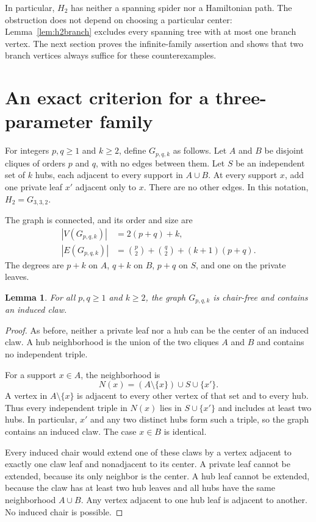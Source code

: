 \documentclass[11pt]{article}
\newtheorem{lemma}[theorem]{Lemma}
\theoremstyle{remark}
\begin{document}
In particular, $H_2$ has neither a spanning spider nor a Hamiltonian path. The obstruction does not depend on choosing a particular center: Lemma~\ref{lem:h2branch} excludes every spanning tree with at most one branch vertex. The next section proves the infinite-family assertion and shows that two branch vertices always suffice for these counterexamples.

\section{An exact criterion for a three-parameter family}

For integers $p,q\geq1$ and $k\geq2$, define $G_{p,q,k}$ as follows. Let $A$ and $B$ be disjoint cliques of orders $p$ and $q$, with no edges between them. Let $S$ be an independent set of $k$ hubs, each adjacent to every support in $A\cup B$. At every support $x$, add one private leaf $x'$ adjacent only to $x$. There are no other edges. In this notation, $H_2=G_{3,3,2}$.

The graph is connected, and its order and size are
\begin{align}
 |V(G_{p,q,k})|&=2(p+q)+k,\label{eq:order}\\
 |E(G_{p,q,k})|&=\binom p2+\binom q2+(k+1)(p+q).\label{eq:size}
\end{align}
The degrees are $p+k$ on $A$, $q+k$ on $B$, $p+q$ on $S$, and one on the private leaves.

\begin{lemma}\label{lem:generalchair}
For all $p,q\geq1$ and $k\geq2$, the graph $G_{p,q,k}$ is chair-free and contains an induced claw.
\end{lemma}
\begin{proof}
As before, neither a private leaf nor a hub can be the center of an induced claw. A hub neighborhood is the union of the two cliques $A$ and $B$ and contains no independent triple.

For a support $x\in A$, the neighborhood is
\[
 N(x)=(A\setminus\{x\})\cup S\cup\{x'\}.
\]
A vertex in $A\setminus\{x\}$ is adjacent to every other vertex of that set and to every hub. Thus every independent triple in $N(x)$ lies in $S\cup\{x'\}$ and includes at least two hubs. In particular, $x'$ and any two distinct hubs form such a triple, so the graph contains an induced claw. The case $x\in B$ is identical.

Every induced chair would extend one of these claws by a vertex adjacent to exactly one claw leaf and nonadjacent to its center. A private leaf cannot be extended, because its only neighbor is the center. A hub leaf cannot be extended, because the claw has at least two hub leaves and all hubs have the same neighborhood $A\cup B$. Any vertex adjacent to one hub leaf is adjacent to another. No induced chair is possible.
\end{proof}
\end{document}
